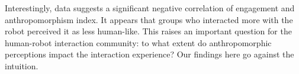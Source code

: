 \documentclass{sig-alternate}
\begin{document}
Interestingly, data suggests a significant negative correlation of engagement
and anthropomorphism index. It appears that groups who interacted more with the
robot perceived it as less human-like. This raises an important question for the
human-robot interaction community: to what extent do anthropomorphic perceptions
impact the interaction experience? Our findings here go against the intuition.


%




\balancecolumns
\end{document}
